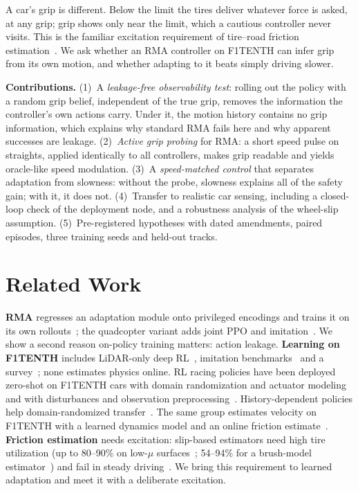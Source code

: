 \documentclass[conference]{IEEEtran}
\begin{document}
A car's grip is different. Below the limit the tires deliver whatever force is asked, at any grip; grip shows only near the limit, which a cautious controller never visits. This is the familiar excitation requirement of tire--road friction estimation~\cite{acosta2017friction,khaleghian2017survey}. We ask whether an RMA controller on F1TENTH can infer grip from its own motion, and whether adapting to it beats simply driving slower.

\textbf{Contributions.}
(1)~A \emph{leakage-free observability test}: rolling out the policy with a random grip belief, independent of the true grip, removes the information the controller's own actions carry. Under it, the motion history contains no grip information, which explains why standard RMA fails here and why apparent successes are leakage.
(2)~\emph{Active grip probing} for RMA: a short speed pulse on straights, applied identically to all controllers, makes grip readable and yields oracle-like speed modulation.
(3)~A \emph{speed-matched control} that separates adaptation from slowness: without the probe, slowness explains all of the safety gain; with it, it does not.
(4)~Transfer to realistic car sensing, including a closed-loop check of the deployment node, and a robustness analysis of the wheel-slip assumption.
(5)~Pre-registered hypotheses with dated amendments, paired episodes, three training seeds and held-out tracks.

\section{Related Work}
\textbf{RMA} regresses an adaptation module onto privileged encodings and trains it on its own rollouts~\cite{kumar2021rma}; the quadcopter variant adds joint PPO and imitation~\cite{zhang2025extreme}. We show a second reason on-policy training matters: action leakage.
\textbf{Learning on F1TENTH} includes LiDAR-only deep RL~\cite{hell2024lidar,evans2023trajectory}, imitation benchmarks~\cite{sun2023ilbenchmark} and a survey~\cite{evans2024unifying}; none estimates physics online. RL racing policies have been deployed zero-shot on F1TENTH cars with domain randomization and actuator modeling~\cite{czechmanowski2025racing} and with disturbances and observation preprocessing~\cite{budai2025endtoend}. History-dependent policies help domain-randomized transfer~\cite{chen2022understanding,tobin2017dr}. The same group estimates velocity on F1TENTH with a learned dynamics model and an online friction estimate~\cite{wegrzynowski2024velocity}.
\textbf{Friction estimation} needs excitation: slip-based estimators need high tire utilization (up to 80--90\% on low-$\mu$ surfaces~\cite{acosta2017friction}; 54--94\% for a brush-model estimator~\cite{prokes2016excitation}) and fail in steady driving~\cite{khaleghian2017survey}. We bring this requirement to learned adaptation and meet it with a deliberate excitation.
\end{document}
